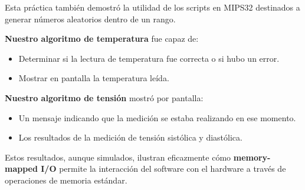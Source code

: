 \documentclass{article}
\begin{document}
	Esta práctica también demostró la utilidad de los scripts en MIPS32 destinados a generar números aleatorios dentro de un rango.
	
	\textbf{Nuestro algoritmo de temperatura} fue capaz de:
	\begin{itemize}
		\item Determinar si la lectura de temperatura fue correcta o si hubo un error.
		\item Mostrar en pantalla la temperatura leída.
	\end{itemize}
	
	\textbf{Nuestro algoritmo de tensión} mostró por pantalla:
	\begin{itemize}
		\item Un mensaje indicando que la medición se estaba realizando en ese momento.
		\item Los resultados de la medición de tensión sistólica y diastólica.
	\end{itemize}
	Estos resultados, aunque simulados, ilustran eficazmente cómo \textbf{memory-mapped I/O} permite la interacción del software con el hardware a través de operaciones de memoria estándar.
	
\end{document}
